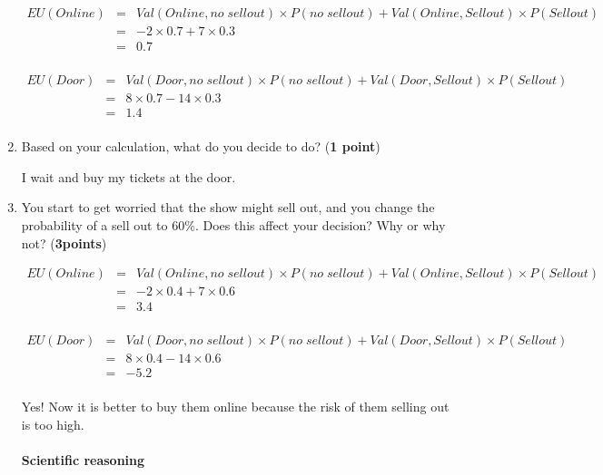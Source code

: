 \documentclass[10pt]{article}
\begin{document}
\begin{enumerate}
\[\begin{array}{rcl}
EU(Online) & = & Val(Online,no \; sellout)\times P(no\;sellout) + Val(Online,Sellout)\times P(Sellout) \\
 & = & -2\times 0.7 + 7\times 0.3 \\
 & = & 0.7 \\   
  \end{array}\]
  
\[\begin{array}{rcl}
EU(Door) & = & Val(Door,no \; sellout)\times P(no\;sellout) + Val(Door,Sellout)\times P(Sellout) \\
 & = & 8\times 0.7 - 14\times 0.3 \\
 & = & 1.4 \\   
  \end{array}\]

\item Based on your calculation, what do you decide to do? (\textbf{1 point})

I wait and buy my tickets at the door.

\item You start to get worried that the show might sell out, and you change the probability of a sell out to $60\%$.  Does this affect your decision? Why or why not? (\textbf{3points})  

\[\begin{array}{rcl}
EU(Online) & = & Val(Online,no \; sellout)\times P(no\;sellout) + Val(Online,Sellout)\times P(Sellout) \\
 & = & -2\times 0.4 + 7\times 0.6 \\
 & = & 3.4 \\   
  \end{array}\]
  
\[\begin{array}{rcl}
EU(Door) & = & Val(Door,no \; sellout)\times P(no\;sellout) + Val(Door,Sellout)\times P(Sellout) \\
 & = & 8\times 0.4 - 14\times 0.6 \\
 & = & -5.2 \\   
  \end{array}\]

  Yes!  Now it is better to buy them online because the risk of them selling out is too high.


\paragraph{Scientific reasoning}


\end{enumerate}
\end{document}
